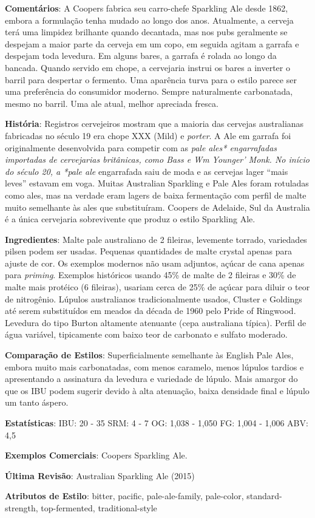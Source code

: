 \textbf{Comentários}: A Coopers fabrica seu carro-chefe Sparkling Ale desde 1862, embora a formulação tenha mudado ao longo dos anos. Atualmente, a cerveja terá uma limpidez brilhante quando decantada, mas nos pubs geralmente se despejam a maior parte da cerveja em um copo, em seguida agitam a garrafa e despejam toda levedura. Em alguns bares, a garrafa é rolada ao longo da bancada. Quando servido em chope, a cervejaria instrui os bares a inverter o barril para despertar o fermento. Uma aparência turva para o estilo parece ser uma preferência do consumidor moderno. Sempre naturalmente carbonatada, mesmo no barril. Uma ale atual, melhor apreciada fresca.

\textbf{História}: Registros cervejeiros mostram que a maioria das cervejas australianas fabricadas no século 19 era chope XXX (Mild) e \textit{porter}. A Ale em garrafa foi originalmente desenvolvida para competir com as \textit{pale ales* engarrafadas importadas de cervejarias britânicas, como Bass e Wm Younger' Monk. No início do século 20, a *pale ale} engarrafada saiu de moda e as cervejas lager “mais leves” estavam em voga. Muitas Australian Sparkling e Pale Ales foram rotuladas como ales, mas na verdade eram lagers de baixa fermentação com perfil de malte muito semelhante às ales que substituíram. Coopers de Adelaide, Sul da Australia é a única cervejaria sobrevivente que produz o estilo Sparkling Ale.

\textbf{Ingredientes}: Malte pale australiano de 2 fileiras, levemente torrado, variedades pilsen podem ser usadas. Pequenas quantidades de malte crystal apenas para ajuste de cor. Os exemplos modernos não usam adjuntos, açúcar de cana apenas para \textit{priming}. Exemplos históricos usando 45\% de malte de 2 fileiras e 30\% de malte mais protéico (6 fileiras), usariam cerca de 25\% de açúcar para diluir o teor de nitrogênio. Lúpulos australianos tradicionalmente usados, Cluster e Goldings até serem substituídos em meados da década de 1960 pelo Pride of Ringwood. Levedura do tipo Burton altamente atenuante (cepa australiana típica). Perfil de água variável, tipicamente com baixo teor de carbonato e sulfato moderado.

\textbf{Comparação de Estilos}: Superficialmente semelhante às English Pale Ales, embora muito mais carbonatadas, com menos caramelo, menos lúpulos tardios e apresentando a assinatura da levedura e variedade de lúpulo. Mais amargor do que os IBU podem sugerir devido à alta atenuação, baixa densidade final e lúpulo um tanto áspero.

\textbf{Estatísticas}: IBU: 20 - 35
SRM: 4 - 7
OG: 1,038 - 1,050
FG: 1,004 - 1,006
ABV: 4,5%

\textbf{Exemplos Comerciais}: Coopers Sparkling Ale.

\textbf{Última Revisão}: Australian Sparkling Ale (2015)

\textbf{Atributos de Estilo}: bitter, pacific, pale-ale-family, pale-color, standard-strength, top-fermented, traditional-style
